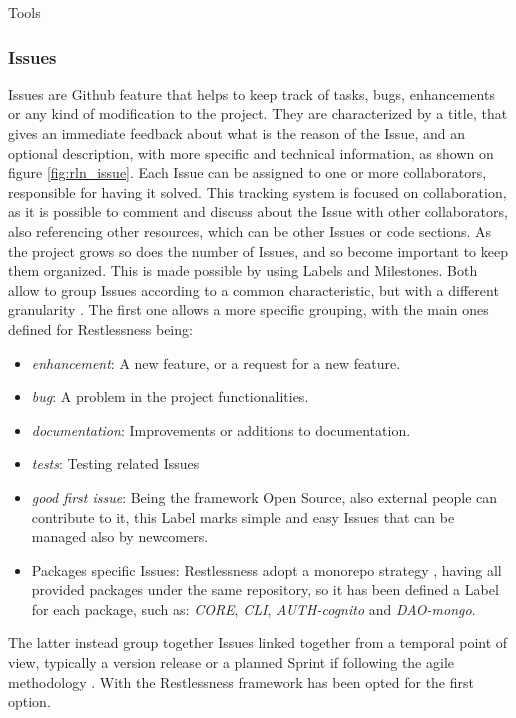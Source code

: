 \begin{chapter}{Tools}
    \subsubsection{Issues}
    Issues are Github feature that helps to keep track of tasks, bugs, enhancements
    or any kind of modification to the project. They are characterized by a title,
    that gives an immediate feedback about what is the reason of the Issue, and an
    optional description, with more specific and technical information, as shown
    on figure \ref{fig:rln_issue}. Each Issue can be assigned to one or more
    collaborators, responsible for having it solved. This tracking system is focused
    on collaboration, as it is possible to comment and discuss about the Issue with
    other collaborators, also referencing other resources, which can be other Issues
    or code sections.
    As the project grows so does the number of Issues, and so become important to
    keep them organized. This is made possible by using Labels and Milestones.
    Both allow to group Issues according to a common characteristic, but with a
    different granularity \cite{github_issues}.
    The first one allows a more specific grouping, with the main ones defined for
    Restlessness being:
    \begin{itemize}
        \item \textit{enhancement}: A new feature, or a request for a new feature.
        \item \textit{bug}: A problem in the project functionalities.
        \item \textit{documentation}: Improvements or additions to documentation.
        \item \textit{tests}: Testing related Issues
        \item \textit{good first issue}: Being the framework Open Source, also
            external people can contribute to it, this Label marks simple and easy
            Issues that can be managed also by newcomers.
        \item Packages specific Issues: Restlessness adopt a monorepo  strategy
            \cite{monorepo}, having all provided packages under the same repository,
            so it has been defined a Label for each package, such as: \textit{CORE},
            \textit{CLI}, \textit{AUTH-cognito} and \textit{DAO-mongo}.
    \end{itemize}
    The latter instead group together Issues linked together from a temporal point
    of view, typically a version release or a planned Sprint if following the agile
    methodology \cite{agile}. With the Restlessness framework has been opted for
    the first option.



\end{chapter}
